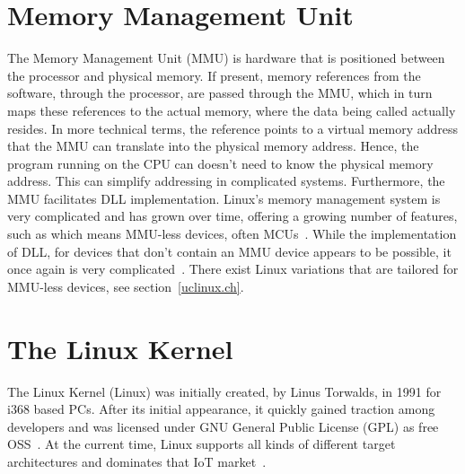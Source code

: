 \section{Memory Management Unit}\label{mmu.ch}
The Memory Management Unit (MMU) is hardware that is positioned between the processor and physical memory. If present, memory references from the software, through the processor, are passed through the MMU, which in turn maps these references to the actual memory, where the data being called actually resides. In more technical terms, the reference points to a virtual memory address that the MMU can translate into the physical memory address. Hence, the program running on the CPU can doesn't need to know the physical memory address. This can simplify addressing in complicated systems. Furthermore, the MMU facilitates DLL implementation. Linux's memory management system is very complicated and has grown over time, offering a growing number of features, such as  which means MMU-less devices, often MCUs~\cite{linuxMMU1, linuxMMU2}. While the implementation of DLL, for devices that don't contain an MMU device appears to be possible, it once again is very complicated~\cite{sharedLibnoMMU}. There exist Linux variations that are tailored for MMU-less devices, see section~\ref{uclinux.ch}.

\section{The Linux Kernel}
The Linux Kernel (Linux) was initially created, by Linus Torwalds, in 1991 for i368 based PCs. After its initial appearance, it quickly gained traction among developers and was licensed under GNU General Public License (GPL) as free OSS~\cite{linuxlicense}. At the current time, Linux supports all kinds of different target architectures and dominates that IoT market~\cite{sabri2017comparison}.



